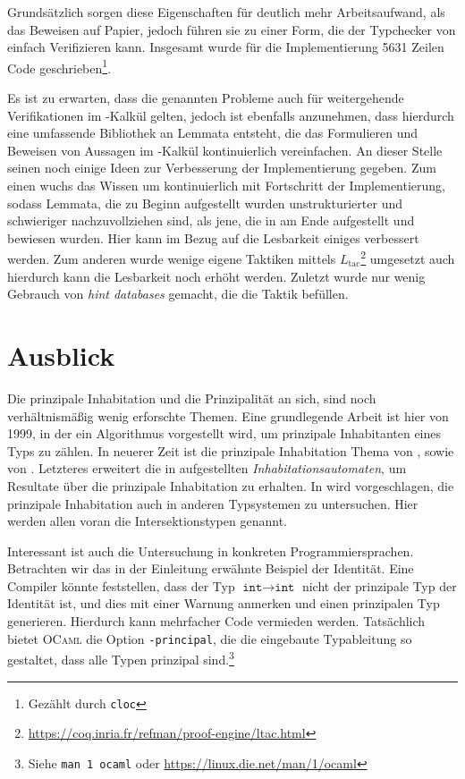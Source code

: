 Grundsätzlich sorgen diese Eigenschaften für deutlich mehr Arbeitsaufwand, als das Beweisen auf Papier, jedoch führen sie zu einer Form, die der Typchecker von \coq{} einfach Verifizieren kann. Insgesamt wurde für die Implementierung 5631 Zeilen Code geschrieben\footnote{Gezählt durch \texttt{cloc}}.

Es ist zu erwarten, dass die genannten Probleme auch für weitergehende Verifikationen im \tlambda-Kalkül gelten, jedoch ist ebenfalls anzunehmen, dass hierdurch eine umfassende Bibliothek an Lemmata entsteht, die das Formulieren und Beweisen von Aussagen im \tlambda-Kalkül kontinuierlich vereinfachen. An dieser Stelle seinen noch einige Ideen zur Verbesserung der Implementierung gegeben. Zum einen wuchs das Wissen um \coq{} kontinuierlich mit Fortschritt der Implementierung, sodass Lemmata, die zu Beginn aufgestellt wurden unstrukturierter und schwieriger nachzuvollziehen sind, als jene, die in am Ende aufgestellt und bewiesen wurden. Hier kann im Bezug auf die Lesbarkeit einiges verbessert werden. Zum anderen wurde wenige eigene Taktiken mittels $L_{\text{tac}}$\footnote{\url{https://coq.inria.fr/refman/proof-engine/ltac.html}} umgesetzt auch hierdurch kann die Lesbarkeit noch erhöht werden. Zuletzt wurde nur wenig Gebrauch von \emph{hint databases} gemacht, die die Taktik  befüllen. 

\section{Ausblick}

Die prinzipale Inhabitation und die Prinzipalität an sich, sind noch verhältnismäßig wenig erforschte Themen. Eine grundlegende Arbeit ist hier \cite{broda} von 1999, in der ein Algorithmus vorgestellt wird, um prinzipale Inhabitanten eines Typs zu zählen. In neuerer Zeit ist die prinzipale Inhabitation Thema von \cite{dudenhefner}, sowie von \cite{machine}. Letzteres erweitert die in \cite{schubert} aufgestellten \emph{Inhabitationsautomaten}, um Resultate über die prinzipale Inhabitation zu erhalten. In \cite{dudenhefner} wird vorgeschlagen, die prinzipale Inhabitation auch in anderen Typsystemen zu untersuchen. Hier werden allen voran die Intersektionstypen \cite{coppo1980} genannt.

Interessant ist auch die Untersuchung in konkreten Programmiersprachen. Betrachten wir das in der Einleitung erwähnte Beispiel der Identität. Eine Compiler könnte feststellen, dass der Typ $\texttt{int} \to \texttt{int}$ nicht der prinzipale Typ der Identität ist, und dies mit einer Warnung anmerken und einen prinzipalen Typ generieren. Hierdurch kann mehrfacher Code vermieden werden. Tatsächlich bietet \textsc{OCaml} die Option \texttt{-principal}, die die eingebaute Typableitung so gestaltet, dass alle Typen prinzipal sind.\footnote{Siehe \texttt{man 1 ocaml} oder \url{https://linux.die.net/man/1/ocaml}} 

